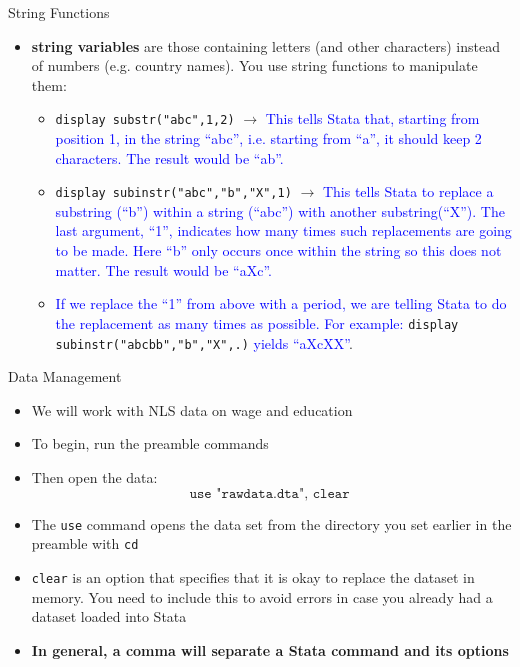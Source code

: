 \documentclass[11pt,notes=hide,aspectratio=169,mathserif]{beamer}
\begin{document}
\begin{frame}{String Functions}
\begin{itemize}
\item \textbf{string variables} are those containing letters (and other characters) instead of numbers (e.g. country names). You use string functions to manipulate them: \medskip
        \begin{itemize}
        \item \texttt{display substr("abc",1,2)} $\rightarrow$ \textcolor{blue}{This tells Stata that, starting from position 1, in the string ``abc'', i.e. starting from ``a'', it should keep 2 characters. The result would be ``ab''.} \smallskip
        \item \texttt{display subinstr("abc","b","X",1)} $\rightarrow$ \textcolor{blue}{This tells Stata to replace a substring (``b'') within a string (``abc'') with another substring(``X''). The last argument, ``1'', indicates how many times such replacements are going to be made. Here ``b'' only occurs once within the string so this does not matter. The result would be ``aXc''. }\smallskip
        \item \textcolor{blue}{If we replace the ``1'' from above with a period, we are telling Stata to do the replacement as many times as possible. For example:} \texttt{display subinstr("abcbb","b","X",.)} \textcolor{blue}{yields ``aXcXX''}. 
    \end{itemize}
\end{itemize}    
\end{frame}

\begin{frame}{Data Management}
\begin{itemize}
    \item We will work with NLS data on wage and education 
    \item To begin, run the preamble commands
    \item Then open the data:
    $$\texttt{use "rawdata.dta", clear }$$ 
    \item The \texttt{use} command opens the data set from the directory you set earlier in the preamble with \texttt{cd}
    \item \texttt{clear} is an option that specifies that it is okay to replace the dataset in memory. You need to include this to avoid errors in case you already had a dataset loaded into Stata
    \item \textbf{In general, a comma will separate a Stata command and its options}
\end{itemize}
\end{frame}
\end{document}
